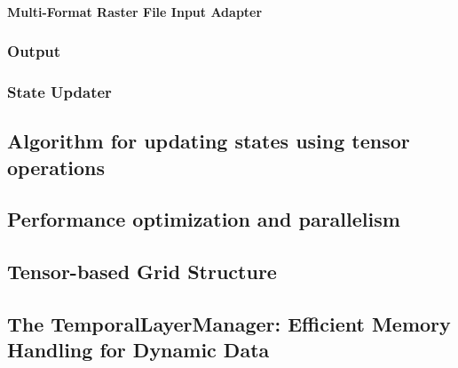 \paragraph{Multi-Format Raster File Input Adapter}



\subsubsection{Output}


\subsubsection{State Updater}


\subsection{Algorithm for updating states using tensor operations}


\subsection{Performance optimization and parallelism}


\subsection{Tensor-based Grid Structure}


\subsection{The TemporalLayerManager: Efficient Memory Handling for Dynamic Data}









